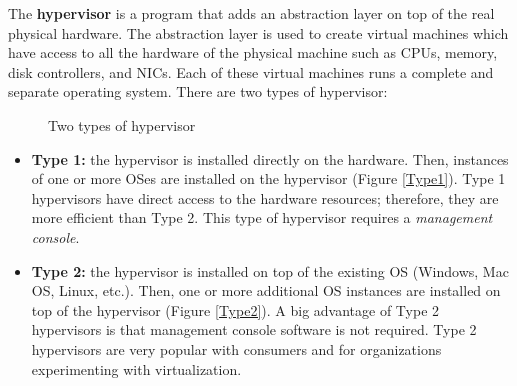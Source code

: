 The \textbf{hypervisor} is a program that adds an abstraction layer on top of the real physical hardware. The abstraction layer is used to create virtual machines which have access to all the hardware of the physical machine such as CPUs, memory, disk controllers, and NICs. Each of these virtual machines runs a complete and separate operating system. There are two types of hypervisor:

\begin{figure}[hbtp]
\caption{Two types of hypervisor}
\centering
{}
\end{figure}


\begin{itemize}
\item \textbf{Type 1:} the hypervisor is installed directly on the hardware. Then, instances of one or more OSes are installed on the hypervisor (Figure \ref{Type1}). Type 1 hypervisors have direct access to the hardware resources; therefore, they are more efficient than Type 2. This type of hypervisor requires a \emph{management console}.

\item \textbf{Type 2:} the hypervisor is installed on top of the existing OS (Windows, Mac OS, Linux, etc.). Then, one or more additional OS instances are installed on top of the hypervisor (Figure \ref{Type2}). A big advantage of Type 2 hypervisors is that management console software is not required. Type 2 hypervisors are very popular with consumers and for organizations experimenting with virtualization.
\end{itemize}

